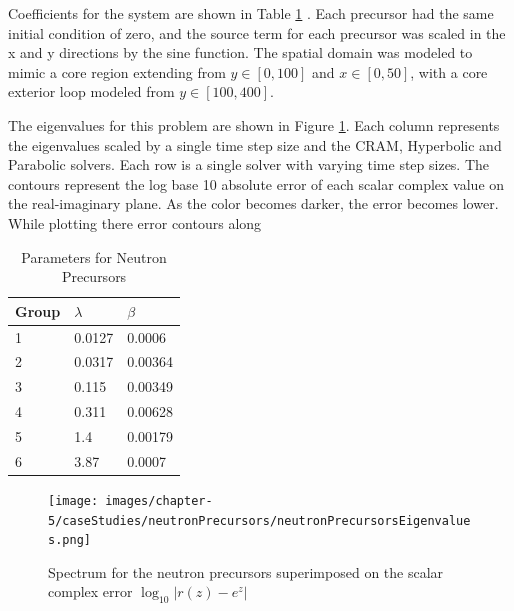 Coefficients for the system are shown in Table \ref{tab:precursorCoeffs} \cite{ott1985}. 
Each precursor had the same initial condition of zero, and the source term for each precursor was scaled in the x and y directions by the sine function. The spatial domain was modeled to mimic a core region extending from $y \in [0,100]$ and $x \in [0,50]$, with a core exterior loop modeled from $y \in [100, 400]$. 

The eigenvalues for this problem are shown in Figure \ref{fig:spectrum_neutron_precursors}. Each column represents the eigenvalues scaled by a single time step size and the CRAM, Hyperbolic and Parabolic solvers. Each row is a single solver with varying time step sizes. The contours represent the log base 10 absolute error of each scalar complex value on the real-imaginary plane. As the color becomes darker, the error becomes lower. While plotting there error contours along 

\clearpage

\begin{table}[p]
   \caption{\label{tab:precursorCoeffs} Parameters for Neutron Precursors}
   \centering
   \begin{tabular}{lll}
   \hline
   Group & $\lambda$ & $\beta$ \\
   \hline
   1 & 0.0127 & 0.0006 \\
   2 & 0.0317 & 0.00364 \\
   3 & 0.115 & 0.00349 \\
   4 & 0.311& 0.00628 \\
   5 & 1.4 & 0.00179\\
   6 & 3.87 & 0.0007 \\
   \hline
   \end{tabular}
\end{table} 

\clearpage

\begin{figure}
    \centering
    \texttt{[image: images/chapter-5/caseStudies/neutronPrecursors/neutronPrecursorsEigenvalues.png]}
    \caption{Spectrum for the neutron precursors superimposed on the scalar complex error $\log_{10}|r(z)-e^{z}|$}
    \label{fig:spectrum_neutron_precursors}
\end{figure}

\clearpage

